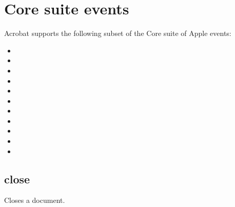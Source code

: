 \documentclass[letterpaper,12pt,english,openany,oneside]{sphinxmanual}
\begin{document}
\section{Core suite events}
\label{\detokenize{IAC_API_AppleEvtObjects:core-suite-events}}
Acrobat supports the following subset of the Core suite of Apple events:
\begin{itemize}
\item {} 

\item {} 

\item {} 

\item {} 

\item {} 

\item {} 

\item {} 

\item {} 

\item {} 

\item {} 

\item {} 

\end{itemize}




\subsection{close}
\label{\detokenize{IAC_API_AppleEvtObjects:close}}
Closes a document.

\label{\detokenize{IAC_API_AppleEvtObjects:syntax-2}}

\begin{sphinxVerbatim}[commandchars=\\\{\}]
 \PYG{p}{[}\PYG{p}{]} 
 \PYG{p}{[}\PYG{p}{]} 
 \PYG{p}{[}\PYG{p}{]}
\end{sphinxVerbatim}
\label{\detokenize{IAC_API_AppleEvtObjects:parameters-2}}
\end{document}
